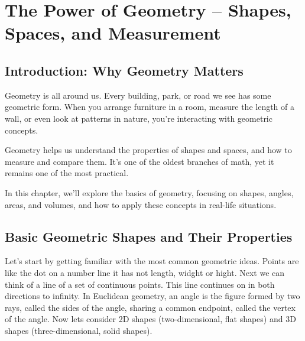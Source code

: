\chapter{The Power of Geometry – Shapes, Spaces, and Measurement}

\section{Introduction: Why Geometry Matters}
Geometry is all around us. Every building, park, or road we see has some geometric form. When you arrange furniture in a room, measure the length of a wall, or even look at patterns in nature, you're interacting with geometric concepts.

Geometry helps us understand the properties of shapes and spaces, and how to measure and compare them. It’s one of the oldest branches of math, yet it remains one of the most practical.

In this chapter, we’ll explore the basics of geometry, focusing on shapes, angles, areas, and volumes, and how to apply these concepts in real-life situations.

\section{Basic Geometric Shapes and Their Properties}
Let’s start by getting familiar with the most common geometric ideas. Points are like the dot on a number line it has not length, widght or hight. Next we can think of a line of a set of continuous points. This line continues on in both directions to infinity. In Euclidean geometry, an angle is the figure formed by two rays, called the sides of the angle, sharing a common endpoint, called the vertex of the angle. Now lets consider 2D shapes (two-dimensional, flat shapes) and 3D shapes (three-dimensional, solid shapes).


